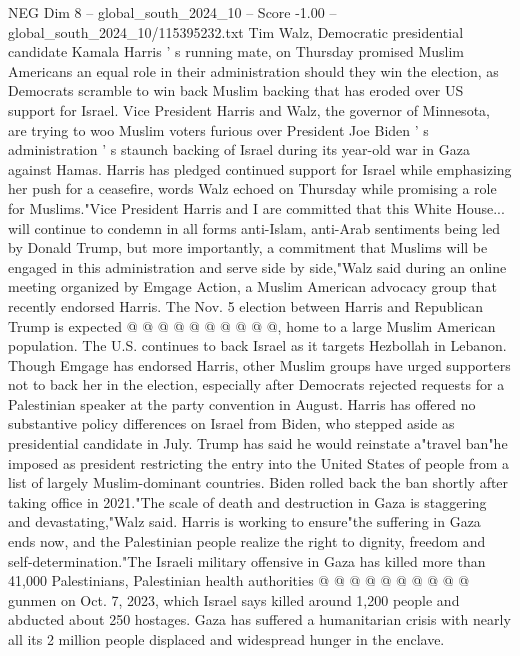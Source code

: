 \begin{textsample}{NEG Dim 8 – global\_south\_2024\_10 – Score -1.00 – global\_south\_2024\_10/115395232.txt}  \label{ex:f8_neg_139}
Tim Walz, Democratic presidential candidate Kamala Harris ' s running mate, on Thursday promised Muslim Americans an equal role in their administration should they win the election, as Democrats scramble to win back Muslim backing that has eroded over US support for Israel.
Vice President Harris and Walz, the governor of Minnesota, are trying to woo Muslim voters furious over President Joe Biden ' s administration ' s staunch backing of Israel during its year-old war in Gaza against Hamas.
Harris has pledged continued support for Israel while emphasizing her push for a ceasefire, words Walz echoed on Thursday while promising a role for Muslims."Vice President Harris and I are committed that this White House... will continue to condemn in all forms anti-Islam, anti-Arab sentiments being led by Donald Trump, but more importantly, a commitment that Muslims will be engaged in this administration and serve side by side,"Walz said during an online meeting organized by Emgage Action, a Muslim American advocacy group that recently endorsed Harris.
The Nov. 5 election between Harris and Republican Trump is expected @ @ @ @ @ @ @ @ @ @, home to a large Muslim American population.
The U.S. continues to back Israel as it targets Hezbollah in Lebanon.
Though Emgage has endorsed Harris, other Muslim groups have urged supporters not to back her in the election, especially after Democrats rejected requests for a Palestinian speaker at the party convention in August.
Harris has offered no substantive policy differences on Israel from Biden, who stepped aside as presidential candidate in July.
Trump has said he would reinstate a"travel ban"he imposed as president restricting the entry into the United States of people from a list of largely Muslim-dominant countries.
Biden rolled back the ban shortly after taking office in 2021."The scale of death and destruction in Gaza is staggering and devastating,"Walz said.
Harris is working to ensure"the suffering in Gaza ends now, and the Palestinian people realize the right to dignity, freedom and self-determination."The Israeli military offensive in Gaza has killed more than 41,000 Palestinians, Palestinian health authorities @ @ @ @ @ @ @ @ @ @ gunmen on Oct. 7, 2023, which Israel says killed around 1,200 people and abducted about 250 hostages.
Gaza has suffered a humanitarian crisis with nearly all its 2 million people displaced and widespread hunger in the enclave.

\end{textsample}
